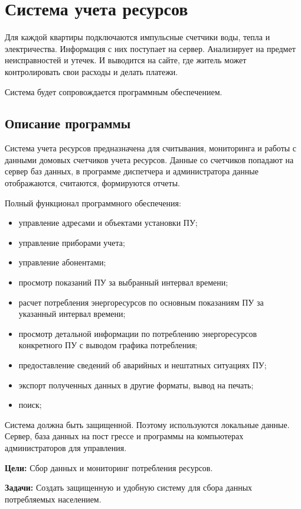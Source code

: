 
\section{Система учета ресурсов}
Для каждой квартиры подключаются импульсные счетчики воды, тепла и электричества. Информация с них поступает на сервер. Анализирует на предмет неисправностей и утечек. И выводится на сайте, где житель может контролировать свои расходы и делать платежи.

Система будет сопровождается программным обеспечением.
\subsection{Описание программы}
Система учета ресурсов предназначена для считывания, мониторинга и работы с данными домовых счетчиков учета ресурсов. Данные со счетчиков попадают на сервер баз данных, в программе диспетчера и администратора данные отображаются, считаются, формируются отчеты.

Полный функционал программного обеспечения:
\begin{itemize}
\item управление адресами и объектами установки ПУ;
\item управление приборами учета;
\item управление абонентами; 
\item просмотр показаний ПУ за выбранный интервал времени; 
\item расчет потребления энергоресурсов по основным показаниям ПУ за указанный интервал времени; 
\item просмотр детальной информации по потреблению энергоресурсов конкретного ПУ с выводом графика потребления; 
\item предоставление сведений об аварийных и нештатных ситуациях ПУ; 
\item экспорт полученных данных в другие форматы, вывод на печать;
\item поиск; 
\end{itemize}

Система должна быть защищенной.  Поэтому используются локальные данные. Сервер, база данных на пост грессе и программы на компьютерах администраторов для управления. 

\textbf{Цели:} Сбор данных и мониторинг потребления ресурсов.
 
\textbf{Задачи:}  Создать защищенную и удобную систему  для сбора данных потребляемых населением.

